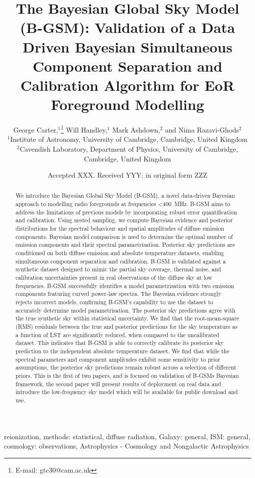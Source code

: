 \documentclass[fleqn,usenatbib]{mnras}
\title[The Bayesian Global Sky Model (B-GSM)]{The Bayesian Global Sky Model (B-GSM): Validation of a Data Driven Bayesian Simultaneous Component Separation and Calibration Algorithm for EoR Foreground Modelling}
\author[G. Carter]{
George Carter,$^{1}$\thanks{E-mail: gtc30@cam.ac.uk}
Will Handley,$^{1}$
Mark Ashdown,$^{2}$
and Nima Razavi-Ghods$^{2}$
\\
$^{1}$Institute of Astronomy, University of Cambridge, Cambridge, United Kingdom\\
$^{2}$Cavendish Laboratory, Department of Physics, University of Cambridge, Cambridge, United Kingdom\\
}
\date{Accepted XXX. Received YYY; in original form ZZZ}
\begin{document}
\label{firstpage}
\pagerange{\pageref{firstpage}--\pageref{lastpage}}
\maketitle

\begin{abstract}  
We introduce the Bayesian Global Sky Model (B-GSM), a novel data-driven Bayesian approach to modelling radio foregrounds at frequencies <400~MHz. B-GSM aims to address the limitations of previous models by incorporating robust error quantification and calibration. Using nested sampling, we compute Bayesian evidence and posterior distributions for the spectral behaviour and spatial amplitudes of diffuse emission components. Bayesian model comparison is used to determine the optimal number of emission components and their spectral parametrisation. Posterior sky predictions are conditioned on both diffuse emission and absolute temperature datasets, enabling simultaneous component separation and calibration. B-GSM is validated against a synthetic dataset designed to mimic the partial sky coverage, thermal noise, and calibration uncertainties present in real observations of the diffuse sky at low frequencies. B-GSM successfully identifies a model parametrisation with two emission components featuring curved power-law spectra. The Bayesian evidence strongly rejects incorrect models, confirming B-GSM's capability to use the dataset to accurately determine model parametrisation. The posterior sky predictions agree with the true synthetic sky within statistical uncertainty. We find that the root-mean-square (RMS) residuals between the true and posterior predictions for the sky temperature as a function of LST are significantly reduced, when compared to the uncalibrated dataset. This indicates that B-GSM is able to correctly calibrate its posterior sky prediction to the independent absolute temperature dataset. We find that while the spectral parameters and component amplitudes exhibit some sensitivity to prior assumptions, the posterior sky predictions remain robust across a selection of different priors. This is the first of two papers, and is focused on validation of B-GSMs Bayesian framework, the second paper will present results of deployment on real data and introduce the low-frequency sky model which will be available for public download and use.

\end{abstract}

\begin{keywords}
reionization, methods: statistical, diffuse radiation, Galaxy: general, ISM: general, cosmology: observations, Astrophysics - Cosmology and Nongalactic Astrophysics
\end{keywords}
\end{document}
